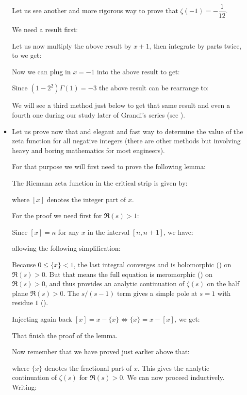 \begin{itemize}
		Let us see another and more rigorous way to prove that $\zeta(-1)=-\dfrac{1}{12}$.
		
		We need a result first:
		
		Let us now multiply the above result by $x+1$, then integrate by parts twice, to we get:
		
		Now we can plug in $x=-1$ into the above result to get:
		
		Since $(1-2^2)\Gamma(1)=-3$ the above result can be rearrange to:
		
		We will see a third method just below to get that same result and even a fourth one during our study later of Grandi's series (see \pageref{Grandi series}).
		
		\item Let us prove now that and elegant and fast way to determine the value of the zeta function for all negative integers (there are other methods but involving heavy and boring mathematics for most engineers).
		
		For that purpose we will first need to prove the following lemma:
		\begin{lemma}
		The Riemann zeta function in the critical strip is given by:
		
		where $[x]$ denotes the integer part of $x$.
		\end{lemma}
		For the proof we need first for $\Re(s) > 1$:
		 
		Since $[x]=n$ for any $x$ in the interval $[n,n+1]$, we have:
		
		allowing the following simplification:
		
		Because $0\leq \{x\}<1$, the last integral converges and is holomorphic () on $\Re(s)>0$. But that means the full equation is meromorphic () on $\Re(s)>0$, and thus provides an analytic continuation of $\zeta(s)$ on the half plane $\Re(s)>0$. The $s/(s-1)$ term gives a simple pole at $s=1$ with residue $1$ ().
		
		Injecting again back $[x] = x-\{x\} \Leftrightarrow \{x\}=x-[x]$, we get:
		
		That finish the proof of the lemma.
		
		Now remember that we have proved just earlier above that:
		
		where $\{x\}$ denotes the fractional part of $x$. This gives the analytic continuation of $\zeta(s)$ for $\Re(s)>0 .$ We can now proceed inductively. Writing:
		

\end{itemize}
